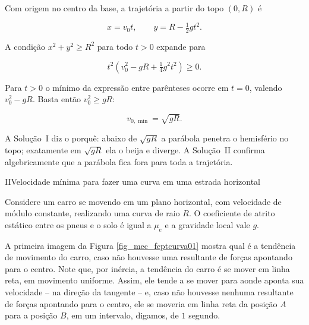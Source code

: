\begin{exemplo}

Com origem no centro da base, a trajetória a partir do topo $(0,R)$ é

$$ x = v_0 t, \qquad y = R - \tfrac{1}{2}gt^2. $$

A condição $x^2 + y^2 \geq R^2$ para todo $t > 0$ expande para

$$ t^2\!\left(v_0^2 - gR + \tfrac{1}{4}g^2t^2\right) \geq 0. $$

Para $t > 0$ o mínimo da expressão entre parênteses ocorre em $t = 0$, valendo
$v_0^2 - gR$. Basta então $v_0^2 \geq gR$:

$$ \boxed{v_{0,\min} = \sqrt{gR}.} $$

A Solução~I diz o porquê: abaixo de $\sqrt{gR}$ a parábola penetra o hemisfério
no topo; exatamente em $\sqrt{gR}$ ela o beija e diverge. A Solução~II confirma
algebricamente que a parábola fica fora para toda a trajetória.

\end{exemplo}
\vspace{0.3cm}




\begin{secnivel}{II}{Velocidade mínima para fazer uma curva em uma estrada horizontal}
  

\end{secnivel}







Considere um carro se movendo em um plano horizontal, com velocidade de módulo constante, realizando uma curva de raio $R.$ O coeficiente de atrito estático entre os pneus e o solo é igual a $\mu_e$ e a gravidade local vale $g.$

A primeira imagem da Figura \ref{fig_mec_fcptcurva01} mostra qual é a tendência de movimento do carro, caso não houvesse uma resultante de forças apontando para o centro. Note que, por inércia, a tendência do carro é se mover em linha reta, em movimento uniforme. Assim, ele tende a se mover para aonde aponta sua velocidade -- na direção da tangente -- e, caso não houvesse nenhuma resultante de forças apontando para o centro, ele se moveria em linha reta da posição $A$ para a posição $B$, em um intervalo, digamos, de $1$ segundo.

